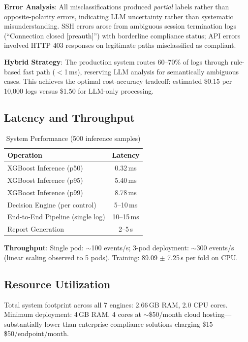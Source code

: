 \documentclass[11pt,conference]{IEEEtran}
\begin{document}
\textbf{Error Analysis}: All misclassifications produced \textit{partial} labels rather than opposite-polarity errors, indicating LLM uncertainty rather than systematic misunderstanding. SSH errors arose from ambiguous session termination logs (``Connection closed [preauth]'') with borderline compliance status; API errors involved HTTP 403 responses on legitimate paths misclassified as compliant.

\textbf{Hybrid Strategy}: The production system routes 60--70\% of logs through rule-based fast path ($<$1\,ms), reserving LLM analysis for semantically ambiguous cases. This achieves the optimal cost-accuracy tradeoff: estimated \$0.15 per 10,000 logs versus \$1.50 for LLM-only processing.

\subsection{Latency and Throughput}

\begin{table}[!t]
\centering
\caption{System Performance (500 inference samples)}
\label{tab:performance}
\begin{tabular}{@{}lc@{}}
\toprule
\textbf{Operation} & \textbf{Latency} \\
\midrule
XGBoost Inference (p50) & 0.32\,ms \\
XGBoost Inference (p95) & 5.40\,ms \\
XGBoost Inference (p99) & 8.78\,ms \\
Decision Engine (per control) & 5--10\,ms \\
End-to-End Pipeline (single log) & 10--15\,ms \\
Report Generation & 2--5\,s \\
\bottomrule
\end{tabular}
\end{table}

\textbf{Throughput}: Single pod: $\sim$100 events/s; 3-pod deployment: $\sim$300 events/s (linear scaling observed to 5 pods). Training: 89.09 $\pm$ 7.25\,s per fold on CPU.

\subsection{Resource Utilization}

Total system footprint across all 7 engines: 2.66\,GB RAM, 2.0 CPU cores. Minimum deployment: 4\,GB RAM, 4 cores at $\sim$\$50/month cloud hosting---substantially lower than enterprise compliance solutions charging \$15--\$50/endpoint/month.
\end{document}
